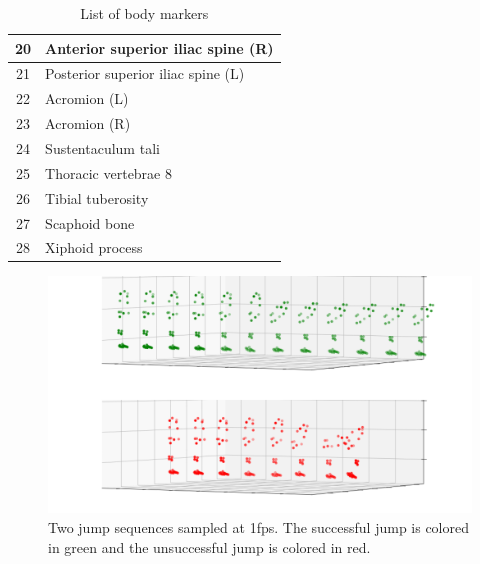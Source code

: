 \begin{table}[!h]
\begin{tabular}{|c|l|}
		20                   & Anterior superior iliac spine (R)        \\ \hline
		21                   & Posterior superior iliac spine (L)       \\ \hline
		22                   & Acromion (L)                             \\ \hline
		23                   & Acromion (R)                             \\ \hline
		24                   & Sustentaculum tali                       \\ \hline
		25                   & Thoracic vertebrae 8                     \\ \hline
		26                   & Tibial tuberosity                        \\ \hline
		27                   & Scaphoid bone                            \\ \hline
		28                   & Xiphoid process                          \\ \hline
	\end{tabular}
	\caption{List of body markers}
	\label{body_markers}
\end{table}



\newpage

\begin{figure}[!hb]
	\centering
	\includegraphics{images/sample_sequence.png}
	\caption{Two jump sequences sampled at 1fps. The successful jump is colored in green and the unsuccessful jump is colored in red.}
	\label{figure:sample sequence}
\end{figure}

